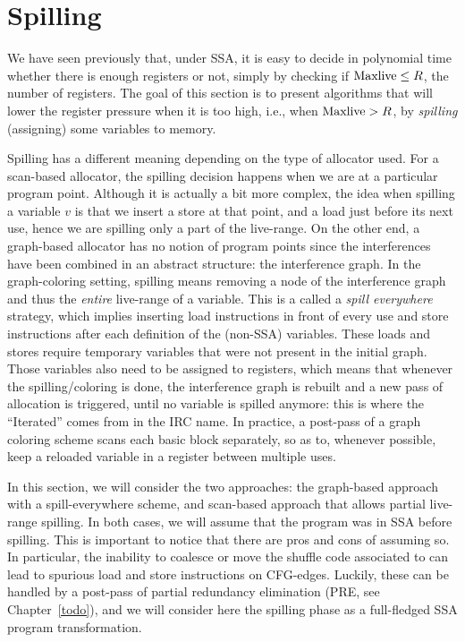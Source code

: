 {  %




\section{Spilling}

We have seen previously that, under SSA, it is easy to decide in polynomial time whether there is enough registers or not, simply by checking if $\mathrm{Maxlive} \leq R$, the number of registers.
The goal of this section is to present algorithms that will lower the register pressure when it is too high, i.e., when $\mathrm{Maxlive} > R$, by \emph{spilling} (assigning) some variables to memory.

Spilling has a different meaning depending on the type of allocator used.
For a scan-based allocator, the spilling decision happens when we are at a particular program point.
Although it is actually a bit more complex, the idea when spilling a variable $v$ is that we insert a store at that point, and a load just before its next use, hence we are spilling only a part of the live-range.
%
On the other end, a graph-based allocator has no notion of program points since the interferences have been combined in an abstract structure: the interference graph.
In the graph-coloring setting, spilling means removing a node of the interference graph and thus the \emph{entire} live-range of a variable.
This is a called a \emph{spill everywhere} strategy, which implies inserting load instructions in front of every use and store instructions after each definition of the (non-SSA) variables.
These loads and stores require temporary variables that were not present in the initial graph.
Those variables also need to be assigned to registers, which means that whenever the spilling/coloring is done, the interference graph is rebuilt and a new pass of allocation is triggered, until no variable is spilled anymore: this is where the ``Iterated'' comes from in the IRC name.
In practice, a post-pass of a graph coloring scheme scans each basic block separately, so as to, whenever possible, keep a reloaded variable in a register between multiple uses.

\smallskip

In this section, we will consider the two approaches: the graph-based approach with a spill-everywhere scheme, and scan-based approach that allows partial live-range spilling.
%
In both cases, we will assume that the program was in SSA before spilling. 
This is important to notice that there are pros and cons of assuming so. 
In particular, the inability to coalesce or move the shuffle code associated to \phifuns can lead to spurious load and store instructions on CFG-edges.
Luckily, these can be handled by a post-pass of partial redundancy elimination (PRE, see Chapter~\ref{todo}), and we will consider here the spilling phase as a full-fledged SSA program transformation.

}

